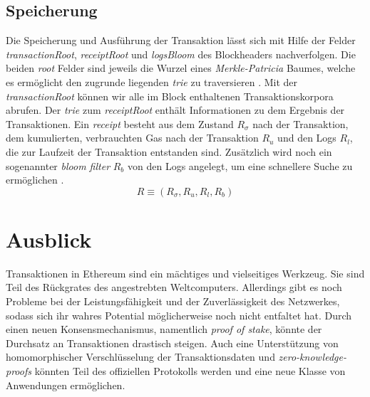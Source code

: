\documentclass[runningheads]{llncs}
\begin{document}
\subsection{Speicherung}
Die Speicherung und Ausführung der Transaktion lässt sich mit Hilfe der Felder \textit{transactionRoot}, \textit{receiptRoot} und \textit{logsBloom} des Blockheaders nachverfolgen. Die beiden \textit{root} Felder sind jeweils die Wurzel eines \textit{Merkle-Patricia} Baumes, welche es ermöglicht den zugrunde liegenden \textit{trie} zu traversieren \cite{noauthor_ethereum/patricia_nodate}. Mit der \textit{transactionRoot} können wir alle  im Block enthaltenen Transaktionskorpora abrufen. Der \textit{trie} zum \textit{receiptRoot} enthält Informationen zu dem Ergebnis der Transaktionen. Ein \textit{receipt} besteht aus dem Zustand $ R_{\sigma} $ nach der Transaktion, dem kumulierten, verbrauchten Gas nach der Transaktion $ R_u $ und den Logs $ R_l $, die zur Laufzeit der Transaktion entstanden sind. Zusätzlich wird noch ein sogenannter \textit{bloom filter} $ R_b $ von den Logs angelegt, um eine schnellere Suche zu ermöglichen \cite{noauthor_logs_nodate}.
$$
  R \equiv (R_{\sigma}, R_u, R_l, R_b)
$$

\section{Ausblick}
Transaktionen in Ethereum sind ein mächtiges und vielseitiges Werkzeug. Sie sind Teil des Rückgrates des angestrebten Weltcomputers. Allerdings gibt es noch Probleme bei der Leistungsfähigkeit und der Zuverlässigkeit des Netzwerkes, sodass sich ihr wahres Potential möglicherweise noch nicht entfaltet hat. Durch einen neuen Konsensmechanismus, namentlich \textit{proof of stake}, könnte der Durchsatz an Transaktionen drastisch steigen. Auch eine Unterstützung von homomorphischer Verschlüsselung der Transaktionsdaten und \textit{zero-knowledge-proofs} könnten Teil des offiziellen Protokolls werden und eine neue Klasse von Anwendungen ermöglichen.



\end{document}
